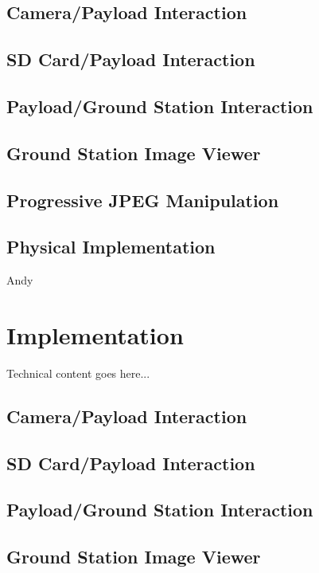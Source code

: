 \documentclass[oneside]{ecsgdp}         %
\begin{document}
\subsection{Camera/Payload Interaction}

\subsection{SD Card/Payload Interaction}

\subsection{Payload/Ground Station Interaction}

\subsection{Ground Station Image Viewer}

\subsection{Progressive JPEG Manipulation}

\subsection{Physical Implementation}
Andy

\section{Implementation}
Technical content goes here...


\subsection{Camera/Payload Interaction}

\subsection{SD Card/Payload Interaction}

\subsection{Payload/Ground Station Interaction}

\subsection{Ground Station Image Viewer}
\end{document}
